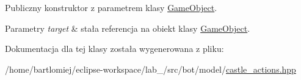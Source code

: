 Publiczny konstruktor z parametrem klasy \hyperlink{classmodel_1_1GameObject}{Game\+Object}. 


\begin{DoxyParams}{Parametry}
{\em target} & stała referencja na obiekt klasy \hyperlink{classmodel_1_1GameObject}{Game\+Object}. \\
\hline
\end{DoxyParams}


Dokumentacja dla tej klasy została wygenerowana z pliku\+:\begin{DoxyCompactItemize}
\item 
/home/bartlomiej/eclipse-\/workspace/lab\+\_/src/bot/model/\hyperlink{castle__actions_8hpp}{castle\+\_\+actions.\+hpp}\end{DoxyCompactItemize}
